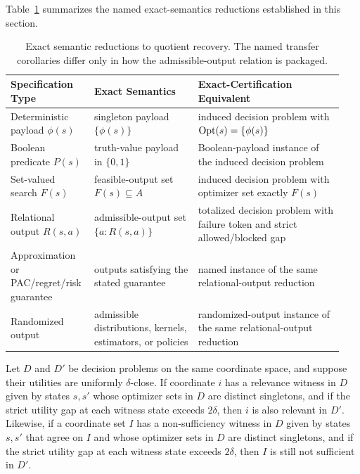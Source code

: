 Table~\ref{tab:exact-semantics-reduction-summary} summarizes the named exact-semantics reductions established in this section.

\begin{table}[h]
\centering
\small
\setlength{\tabcolsep}{4pt}
\renewcommand{\arraystretch}{1.12}
\renewcommand{\tabularxcolumn}[1]{m{#1}}
\begin{tabularx}{\linewidth}{@{}>{\raggedright\arraybackslash}m{0.22\linewidth}>{\raggedright\arraybackslash}m{0.30\linewidth}>{\raggedright\arraybackslash}m{0.42\linewidth}@{}}
\toprule
\textbf{Specification Type} & \textbf{Exact Semantics} & \textbf{Exact-Certification Equivalent} \\
\midrule
Deterministic payload $\phi(s)$ & singleton payload $\{\phi(s)\}$ & induced decision problem with $\operatorname{Opt}(s)=\{\phi(s)\}$ \\
\midrule
Boolean predicate $P(s)$ & truth-value payload in $\{0,1\}$ & Boolean-payload instance of the induced decision problem \\
\midrule
Set-valued search $F(s)$ & feasible-output set $F(s) \subseteq A$ & induced decision problem with optimizer set exactly $F(s)$ \\
\midrule
Relational output $R(s,a)$ & admissible-output set $\{a : R(s,a)\}$ & totalized decision problem with failure token and strict allowed/blocked gap \\
\midrule
Approximation or PAC/regret/risk guarantee & outputs satisfying the stated guarantee & named instance of the same relational-output reduction \\
\midrule
Randomized output & admissible distributions, kernels, estimators, or policies & randomized-output instance of the same relational-output reduction \\
\bottomrule
\end{tabularx}
\caption{Exact semantic reductions to quotient recovery. The named transfer corollaries differ only in how the admissible-output relation is packaged.}
\label{tab:exact-semantics-reduction-summary}
\end{table}

\begin{proposition}\label{prop:approximate-relevance-needs-stability-control}
Let $D$ and $D'$ be decision problems on the same coordinate space, and suppose their utilities are uniformly $\delta$-close. If coordinate $i$ has a relevance witness in $D$ given by states $s,s'$ whose optimizer sets in $D$ are distinct singletons, and if the strict utility gap at each witness state exceeds $2\delta$, then $i$ is also relevant in $D'$. Likewise, if a coordinate set $I$ has a non-sufficiency witness in $D$ given by states $s,s'$ that agree on $I$ and whose optimizer sets in $D$ are distinct singletons, and if the strict utility gap at each witness state exceeds $2\delta$, then $I$ is still not sufficient in $D'$.
\end{proposition}

